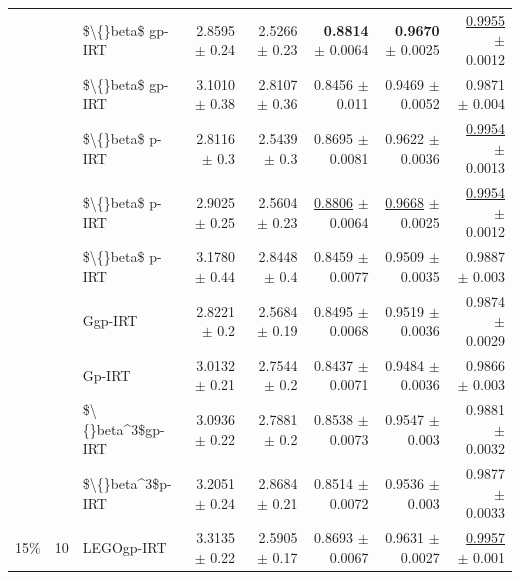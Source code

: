 \begin{longtable}{llp{}rrrrr}
 &  & \$\textbackslash\{\}beta\$ gp-IRT & 2.8595 {\scriptsize $\pm$ 0.24} & 2.5266 {\scriptsize $\pm$ 0.23} & \textbf{0.8814} {\scriptsize $\pm$ 0.0064} & \textbf{0.9670} {\scriptsize $\pm$ 0.0025} & \underline{0.9955} {\scriptsize $\pm$ 0.0012} \\
 &  & \$\textbackslash\{\}beta\$ gp-IRT & 3.1010 {\scriptsize $\pm$ 0.38} & 2.8107 {\scriptsize $\pm$ 0.36} & 0.8456 {\scriptsize $\pm$ 0.011} & 0.9469 {\scriptsize $\pm$ 0.0052} & 0.9871 {\scriptsize $\pm$ 0.004} \\
 &  & \$\textbackslash\{\}beta\$ p-IRT & 2.8116 {\scriptsize $\pm$ 0.3} & 2.5439 {\scriptsize $\pm$ 0.3} & 0.8695 {\scriptsize $\pm$ 0.0081} & 0.9622 {\scriptsize $\pm$ 0.0036} & \underline{0.9954} {\scriptsize $\pm$ 0.0013} \\
 &  & \$\textbackslash\{\}beta\$ p-IRT & 2.9025 {\scriptsize $\pm$ 0.25} & 2.5604 {\scriptsize $\pm$ 0.23} & \underline{0.8806} {\scriptsize $\pm$ 0.0064} & \underline{0.9668} {\scriptsize $\pm$ 0.0025} & \underline{0.9954} {\scriptsize $\pm$ 0.0012} \\
 &  & \$\textbackslash\{\}beta\$ p-IRT & 3.1780 {\scriptsize $\pm$ 0.44} & 2.8448 {\scriptsize $\pm$ 0.4} & 0.8459 {\scriptsize $\pm$ 0.0077} & 0.9509 {\scriptsize $\pm$ 0.0035} & 0.9887 {\scriptsize $\pm$ 0.003} \\
 &  & Ggp-IRT & 2.8221 {\scriptsize $\pm$ 0.2} & 2.5684 {\scriptsize $\pm$ 0.19} & 0.8495 {\scriptsize $\pm$ 0.0068} & 0.9519 {\scriptsize $\pm$ 0.0036} & 0.9874 {\scriptsize $\pm$ 0.0029} \\
 &  & Gp-IRT & 3.0132 {\scriptsize $\pm$ 0.21} & 2.7544 {\scriptsize $\pm$ 0.2} & 0.8437 {\scriptsize $\pm$ 0.0071} & 0.9484 {\scriptsize $\pm$ 0.0036} & 0.9866 {\scriptsize $\pm$ 0.003} \\
 &  & \$\textbackslash\{\}beta\textasciicircum{}3\$gp-IRT & 3.0936 {\scriptsize $\pm$ 0.22} & 2.7881 {\scriptsize $\pm$ 0.2} & 0.8538 {\scriptsize $\pm$ 0.0073} & 0.9547 {\scriptsize $\pm$ 0.003} & 0.9881 {\scriptsize $\pm$ 0.0032} \\
 &  & \$\textbackslash\{\}beta\textasciicircum{}3\$p-IRT & 3.2051 {\scriptsize $\pm$ 0.24} & 2.8684 {\scriptsize $\pm$ 0.21} & 0.8514 {\scriptsize $\pm$ 0.0072} & 0.9536 {\scriptsize $\pm$ 0.003} & 0.9877 {\scriptsize $\pm$ 0.0033} \\
\midrule
15\% & 10 & LEGOgp-IRT & 3.3135 {\scriptsize $\pm$ 0.22} & 2.5905 {\scriptsize $\pm$ 0.17} & 0.8693 {\scriptsize $\pm$ 0.0067} & 0.9631 {\scriptsize $\pm$ 0.0027} & \underline{0.9957} {\scriptsize $\pm$ 0.001} \\

\end{longtable}
